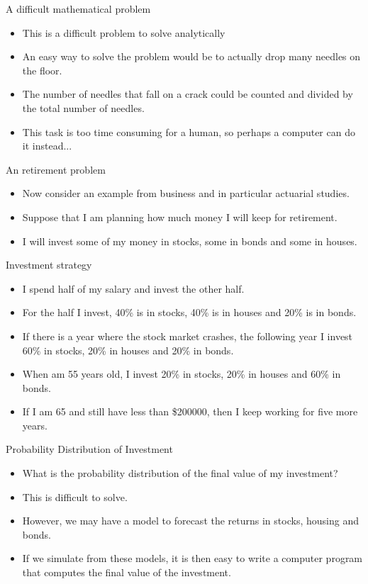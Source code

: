 \documentclass
[handout]
{beamer}
\begin{document}
\begin{frame}{A difficult mathematical problem}
\begin{itemize}
\item This is a difficult problem to solve analytically
\pause
\item An easy way to solve the problem would be to actually drop many needles on the floor.
\pause
\item The number of needles that fall on a crack could be counted and divided by the total number of needles.
\pause
\item This task is too time consuming for a human, so perhaps a computer can do it instead...
\end{itemize}
\end{frame}
\begin{frame}{An retirement problem}
\begin{itemize}
\item Now consider an example from business and in particular actuarial studies.
\pause
\item Suppose that I am planning how much money I will keep for retirement.
\pause
\item I will invest some of my money in stocks, some in bonds and some in houses.
\end{itemize}
\end{frame}
\begin{frame}{Investment strategy}
\begin{itemize}
\item I spend half of my salary and invest the other half.
\pause
\item For the half I invest, 40\% is in stocks, 40\% is in houses and 20\% is in bonds.
\pause
\item If there is a year where the stock market crashes, the following year I invest 60\% in stocks, 20\%  in houses and 20\% in bonds.
\pause
\item When am 55 years old, I invest 20\% in stocks, 20\%  in houses and 60\% in bonds.
\pause
\item If I am 65 and still have less than \$200000, then I keep working for five more years.
\end{itemize}
\end{frame}
\begin{frame}{Probability Distribution of Investment}
\begin{itemize}
\item What is the probability distribution of the final value of my investment?
\pause
\item This is difficult to solve.
\pause
\item However, we may have a model to forecast the returns in stocks, housing and bonds.
\pause
\item If we simulate from these models, it is then easy to write a computer program that computes the final value of the investment.
\end{itemize}
\end{frame}
\end{document}
